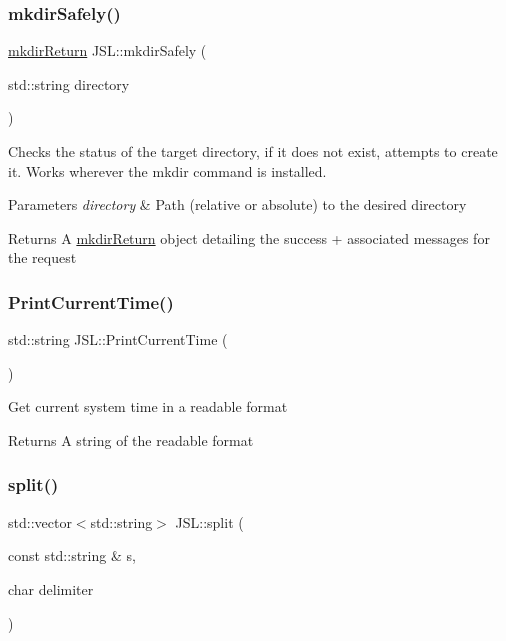 \subsubsection{\texorpdfstring{mkdir\+Safely()}{mkdirSafely()}}
{\footnotesize\ttfamily \hyperlink{structJSL_1_1mkdirReturn}{mkdir\+Return} J\+S\+L\+::mkdir\+Safely (\begin{DoxyParamCaption}\item[{std\+::string}]{directory }\end{DoxyParamCaption})\hspace{0.3cm}{\ttfamily [inline]}}

Checks the status of the target directory, if it does not exist, attempts to create it. Works wherever the {\ttfamily mkdir} command is installed. 
\begin{DoxyParams}{Parameters}
{\em directory} & Path (relative or absolute) to the desired directory \\
\hline
\end{DoxyParams}
\begin{DoxyReturn}{Returns}
A \hyperlink{structJSL_1_1mkdirReturn}{mkdir\+Return} object detailing the success + associated messages for the request 
\end{DoxyReturn}
\mbox{\label{namespaceJSL_a22fc26d87034a744e42e70e77db892df}} 
\subsubsection{\texorpdfstring{Print\+Current\+Time()}{PrintCurrentTime()}}
{\footnotesize\ttfamily std\+::string J\+S\+L\+::\+Print\+Current\+Time (\begin{DoxyParamCaption}{ }\end{DoxyParamCaption})\hspace{0.3cm}{\ttfamily [inline]}}

Get current system time in a readable format \begin{DoxyReturn}{Returns}
A string of the readable format 
\end{DoxyReturn}
\mbox{\label{namespaceJSL_a34a7ba28084b304e97a707c653dce887}} 
\subsubsection{\texorpdfstring{split()}{split()}}
{\footnotesize\ttfamily std\+::vector$<$std\+::string$>$ J\+S\+L\+::split (\begin{DoxyParamCaption}\item[{const std\+::string \&}]{s,  }\item[{char}]{delimiter }\end{DoxyParamCaption})\hspace{0.3cm}{\ttfamily [inline]}}

